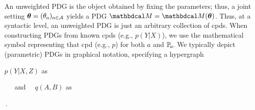 \documentclass{article} %
\theoremstyle{plain}
\theoremstyle{definition}
\theoremstyle{remark}
\newcommand\mat[1]{\mathbf{#1}}
\newcommand\btheta{\boldsymbol\theta}
\newcommand\vfull[1]{}
\begin{document}
An unweighted PDG is the object obtained by fixing the parameters; thus,
a
joint setting
$\btheta = (\theta_a)_{a \in \Ar}$ yields a PDG
$\dg M = \dg M(\btheta)$.
Thus, at a syntactic level, an unweighted PDG is just an arbitrary collection of cpds. 
When constructing PDGs from known cpds (e.g., $p(Y|X)$), we use the mathematical symbol representing that cpd (e.g., $p$) for both $a$ and $\p_a$. 
We typically depict (parametric) PDGs in graphical notation, specifying a hypergraph 
\vspace{-3ex}
\begin{center}
$p(Y|X,Z)$ \;as\;
\,
$\quad$and$\quad$ $q(A,B)$ \;as\;
\,.
\end{center}
%
\vfull{
Given PDGs $\dg M_1$ and \vphantom{$\big|$}$\dg M_2$,
   let denote $\dg M_1 + \dg M_2$ the PDG with their combined information, e.g., by taking the disjoint union of their arcs. 
}
\end{document}
